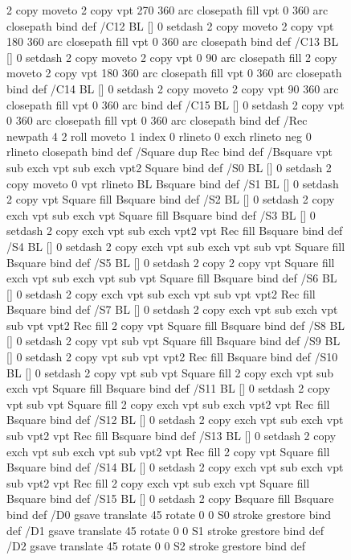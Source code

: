 \documentclass{LMCS}
\begin{document}
\begin{figure}[!tbp]
\begin{minipage}[b]{.47\linewidth}
{{{{       2 copy moveto
       2 copy  vpt 270 360 arc closepath fill
               vpt 0 360 arc closepath } bind def
/C12 { BL [] 0 setdash 2 copy moveto
       2 copy  vpt 180 360 arc closepath fill
               vpt 0 360 arc closepath } bind def
/C13 { BL [] 0 setdash  2 copy moveto
       2 copy  vpt 0 90 arc closepath fill
       2 copy moveto
       2 copy  vpt 180 360 arc closepath fill
               vpt 0 360 arc closepath } bind def
/C14 { BL [] 0 setdash 2 copy moveto
       2 copy  vpt 90 360 arc closepath fill
               vpt 0 360 arc } bind def
/C15 { BL [] 0 setdash 2 copy vpt 0 360 arc closepath fill
               vpt 0 360 arc closepath } bind def
/Rec   { newpath 4 2 roll moveto 1 index 0 rlineto 0 exch rlineto
       neg 0 rlineto closepath } bind def
/Square { dup Rec } bind def
/Bsquare { vpt sub exch vpt sub exch vpt2 Square } bind def
/S0 { BL [] 0 setdash 2 copy moveto 0 vpt rlineto BL Bsquare } bind def
/S1 { BL [] 0 setdash 2 copy vpt Square fill Bsquare } bind def
/S2 { BL [] 0 setdash 2 copy exch vpt sub exch vpt Square fill Bsquare } bind def
/S3 { BL [] 0 setdash 2 copy exch vpt sub exch vpt2 vpt Rec fill Bsquare } bind def
/S4 { BL [] 0 setdash 2 copy exch vpt sub exch vpt sub vpt Square fill Bsquare } bind def
/S5 { BL [] 0 setdash 2 copy 2 copy vpt Square fill
       exch vpt sub exch vpt sub vpt Square fill Bsquare } bind def
/S6 { BL [] 0 setdash 2 copy exch vpt sub exch vpt sub vpt vpt2 Rec fill Bsquare } bind def
/S7 { BL [] 0 setdash 2 copy exch vpt sub exch vpt sub vpt vpt2 Rec fill
       2 copy vpt Square fill
       Bsquare } bind def
/S8 { BL [] 0 setdash 2 copy vpt sub vpt Square fill Bsquare } bind def
/S9 { BL [] 0 setdash 2 copy vpt sub vpt vpt2 Rec fill Bsquare } bind def
/S10 { BL [] 0 setdash 2 copy vpt sub vpt Square fill 2 copy exch vpt sub exch vpt Square fill
       Bsquare } bind def
/S11 { BL [] 0 setdash 2 copy vpt sub vpt Square fill 2 copy exch vpt sub exch vpt2 vpt Rec fill
       Bsquare } bind def
/S12 { BL [] 0 setdash 2 copy exch vpt sub exch vpt sub vpt2 vpt Rec fill Bsquare } bind def
/S13 { BL [] 0 setdash 2 copy exch vpt sub exch vpt sub vpt2 vpt Rec fill
       2 copy vpt Square fill Bsquare } bind def
/S14 { BL [] 0 setdash 2 copy exch vpt sub exch vpt sub vpt2 vpt Rec fill
       2 copy exch vpt sub exch vpt Square fill Bsquare } bind def
/S15 { BL [] 0 setdash 2 copy Bsquare fill Bsquare } bind def
/D0 { gsave translate 45 rotate 0 0 S0 stroke grestore } bind def
/D1 { gsave translate 45 rotate 0 0 S1 stroke grestore } bind def
/D2 { gsave translate 45 rotate 0 0 S2 stroke grestore } bind def
}}}
\end{minipage}
\end{figure}
\end{document}
